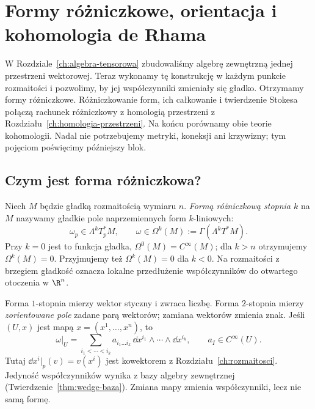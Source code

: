 \chapter{Formy różniczkowe, orientacja i kohomologia de Rhama}
\label{ch:formy-de-rham}

\providecommand{\atlasref}[2]{#2}


W Rozdziale~\ref{ch:algebra-tensorowa} zbudowaliśmy algebrę
zewnętrzną jednej przestrzeni wektorowej. Teraz wykonamy tę
konstrukcję w każdym punkcie rozmaitości i pozwolimy, by jej
współczynniki zmieniały się gładko. Otrzymamy formy różniczkowe.
Różniczkowanie form, ich całkowanie i twierdzenie Stokesa
połączą rachunek różniczkowy z homologią przestrzeni z
Rozdziału~\ref{ch:homologia-przestrzeni}. Na końcu porównamy
obie teorie kohomologii. Nadal nie potrzebujemy metryki,
koneksji ani krzywizny; tym pojęciom poświęcimy późniejszy blok.

\section{Czym jest forma różniczkowa?}
\label{sec:formy-definicje}

\begin{definicja}
\label{def:forma-rozniczkowa}
Niech $M$ będzie gładką rozmaitością wymiaru $n$.
\emph{Formą różniczkową stopnia $k$} na $M$ nazywamy
gładkie pole naprzemiennych form $k$-liniowych:
\[
 \omega_p\in\Lambda^k T_p^*M,
 \qquad \omega\in\Omega^k(M)
 :=\Gamma(\Lambda^k T^*M).
\]
Przy $k=0$ jest to funkcja gładka,
$\Omega^0(M)=C^\infty(M)$; dla $k>n$ otrzymujemy
$\Omega^k(M)=0$. Przyjmujemy też $\Omega^k(M)=0$ dla $k<0$.
Na rozmaitości z brzegiem gładkość
oznacza lokalne przedłużenie współczynników do
otwartego otoczenia w $\R^n$.
\end{definicja}

Forma $1$-stopnia mierzy wektor styczny i zwraca liczbę.
Forma $2$-stopnia mierzy \emph{zorientowane pole} zadane
parą wektorów; zamiana wektorów zmienia znak.
Jeśli $(U,x)$ jest mapą $x=(x^1,\ldots,x^n)$, to
\begin{equation}\label{eq:forma-lokalna}
 \omega|_U=\sum_{i_1<\cdots<i_k}
 a_{i_1\ldots i_k}\,\dd x^{i_1}\wedge\cdots\wedge\dd x^{i_k},
 \qquad a_I\in C^\infty(U).
\end{equation}
Tutaj $\dd x^i|_p(v)=v(x^i)$ jest kowektorem z
Rozdziału~\ref{ch:rozmaitosci}. Jedyność współczynników
wynika z bazy algebry zewnętrznej
(Twierdzenie~\ref{thm:wedge-baza}). Zmiana mapy zmienia
współczynniki, lecz nie samą formę.

